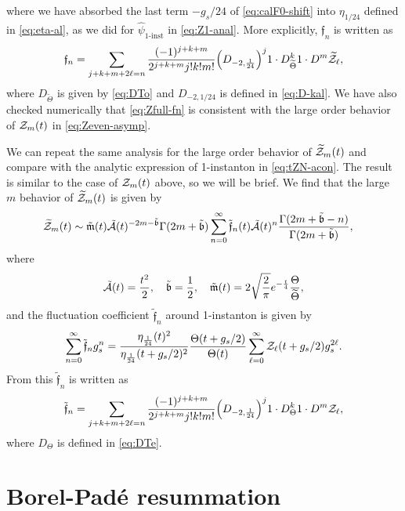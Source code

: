 \documentclass[11pt]{article}
\def\h#1{\widehat{#1}}
\def\Ga{\Gamma}
\def\rt#1{\sqrt{#1}}
\renewcommand{\[}{\begin{eqnarray}}
\renewcommand{\]}{\end{eqnarray}}
\newcommand{\Zeven}{{\cal Z}}
\newcommand{\Zodd}{{\widetilde{\cal Z}}}
\newcommand{\Thetaeven}{\Theta}
\newcommand{\Thetaodd}{{\widetilde{\Theta}}}
\newcommand{\Aodd}{{\tilde{\cal A}}}
\newcommand{\beven}{\mathfrak{b}}
\newcommand{\bodd}{{\tilde{\beven}}}
\newcommand{\feven}{\mathfrak{f}}
\newcommand{\fodd}{{\tilde{\feven}}}
\newcommand{\mueven}{\mathfrak{m}}
\newcommand{\muodd}{\tilde{\mueven}}
\newcommand{\DTeven}{D_\Thetaeven}
\newcommand{\DTodd}{D_\Thetaodd}
\begin{document}
where we have absorbed the last term $-g_s/24$
of \eqref{eq:calF0-shift} into
$\eta_{1/24}$ defined in \eqref{eq:eta-al}, as we did for $\h{\psi}_{\text{1-inst}}$ 
in \eqref{eq:Z1-anal}.
More explicitly, $\feven_n$ is written as
\begin{align}
 \feven_n=\sum_{j+k+m+2\ell=n}\frac{(-1)^{j+k+m}}{2^{j+k+m}j!k!m!}
\Big(D_{-2,\frac{1}{24}}\Big)^j1\cdot \DTodd^k1\cdot D^m \Zodd_{\ell},
\label{eq:Zfull-fn}
\end{align}
where $\DTodd$ is given by \eqref{eq:DTo}
and $D_{-2,1/24}$ is defined in \eqref{eq:D-kal}.
We have also checked numerically 
that \eqref{eq:Zfull-fn}
is consistent with the large order behavior of $\Zeven_m(t)$ in \eqref{eq:Zeven-asymp}.

We can repeat the same analysis for
the large order behavior of $\Zodd_m(t)$
and compare with the analytic expression of 1-instanton in \eqref{eq:tZN-acon}.
The result is similar to the case of $\Zeven_m(t)$ above, so we will be brief.
We find that the large $m$ behavior of $\Zodd_m(t)$ is given by
%
\begin{align}
\begin{aligned}
 \Zodd_m(t)
&\sim\muodd(t) \Aodd(t)^{-2m-\bodd}\Ga(2m+\bodd)\sum_{n=0}^\infty
  \fodd_n(t) \Aodd(t)^n\frac{\Ga(2m+\bodd-n)}{\Ga(2m+\bodd)},
\end{aligned}
\end{align}
%
where 
\begin{align}
 \Aodd(t)=\frac{t^2}{2},\quad \bodd=\frac{1}{2},\quad
\muodd(t)=2\rt{\frac{2}{\pi}}e^{-\frac{t}{4}}\frac{\Thetaeven}{\Thetaodd},
\end{align}
and the fluctuation coefficient $\fodd_n$ around 1-instanton
is given by
\begin{align}
 \sum_{n=0}^\infty \fodd_n g_s^n
 =\frac{\eta_{\frac{1}{24}}(t)^2}{\eta_{\frac{1}{24}}(t+g_s/2)^2}
  \frac{\Thetaeven(t+g_s/2)}{\Thetaeven(t)}
\sum_{\ell=0}^\infty \Zeven_\ell(t+g_s/2)g_s^{2\ell}.
\end{align}
From this $\fodd_n$ is written as
\begin{align}
 \fodd_n=\sum_{j+k+m+2\ell=n}\frac{(-1)^{j+k+m}}{2^{j+k+m}j!k!m!}
\Big(D_{-2,\frac{1}{24}}\Big)^j1\cdot \DTeven^k1\cdot D^m \Zeven_{\ell},
\end{align}
where $\DTeven$ 
is defined in \eqref{eq:DTe}.


\section{Borel-Pad\'{e} resummation \label{sec:borel}}
\end{document}
